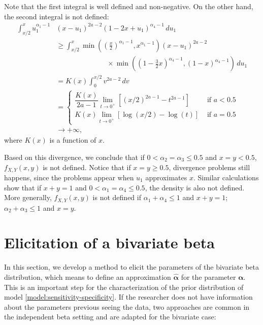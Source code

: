 Note that the first integral is well defined and non-negative. On the other hand, the second integral is not defined: 
\begin{equation*}
  \begin{split}
    \int_{x/2}^{x} u_1^{\alpha_1-1}&(x-u_1)^{2a-2}(1-2x+u_1)^{\alpha_4-1} \, du_1 \\
    &\ge \int_{x/2}^x \min\left(\left(\frac{x}{2}\right)^{\alpha_1-1}, x^{\alpha_1-1}\right)(x-u_1)^{2a-2} \\ 
    &\hspace{3cm} \times \min\left(\left(1-\frac{3}{2}x\right)^{\alpha_4-1}, (1-x)^{\alpha_4-1}\right) \, du_1 \\
    &= K(x) \int_{0}^{x/2} v^{2a-2} \, dv \\ 
    &= \begin{cases}
      \dfrac{K(x)}{2a-1} \lim_{t \to 0^+} \left[(x/2)^{2a-1} - t^{2a-1}\right] &\text{ if } a < 0.5 \\ 
      K(x) \lim_{t \to 0^+} \left[\log(x/2) - \log(t)\right] &\text{ if } a = 0.5
    \end{cases} \\
    &\to +\infty, 
  \end{split}
\end{equation*}
where $K(x)$ is a function of $x$. 

Based on this divergence, we conclude that if $0 < \alpha_2 = \alpha_3 \le 0.5$
and $x = y < 0.5$, $f_{X,Y}(x,y)$ is not defined. Notice that if $x = y \ge
0.5$, divergence problems still happens, since the problems appear when $u_1$ approximates $x$. Similar calculations show that if $x + y = 1$ and $0 < \alpha_1 = \alpha_4 \le 0.5$, the density is also
not defined. More generally, $f_{X,Y}(x,y)$ is not defined if $\alpha_1 +
\alpha_4 \le 1$ and $x + y = 1$; $\alpha_2 + \alpha_3 \le 1$ and $x = y$.

\section{Elicitation of a bivariate beta}

In this section, we develop a method to elicit the parameters of the bivariate
beta distribution, which means to define an approximation
$\hat{\boldsymbol{\alpha}}$ for the parameter $\boldsymbol{\alpha}$. 
This is an important step for the characterization of the prior distribution of model
\eqref{model:sensitivity-specificity}. If the researcher does not have
information about the parameters previous seeing the data, two approaches
are common in the independent beta setting and are adapted for the bivariate 
case:

